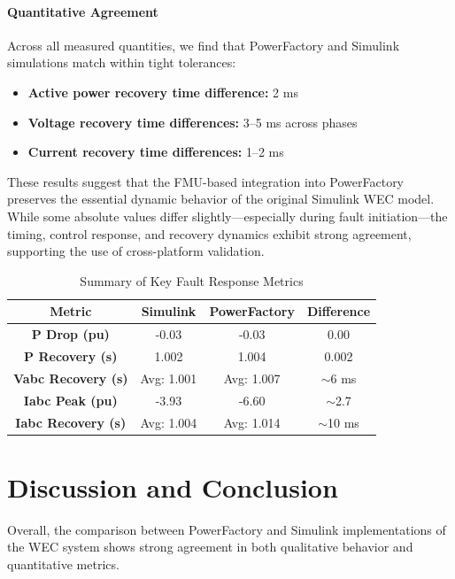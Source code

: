 \documentclass[conference]{IEEEtran}
\begin{document}
    \paragraph{Quantitative Agreement} Across all measured quantities, we find that PowerFactory and Simulink simulations match within tight tolerances:
    \begin{itemize}
        \item \textbf{Active power recovery time difference:} 2 ms
        \item \textbf{Voltage recovery time differences:} 3–5 ms across phases
        \item \textbf{Current recovery time differences:} 1–2 ms
    \end{itemize}
    
    These results suggest that the FMU-based integration into PowerFactory preserves the essential dynamic behavior of the original Simulink WEC model. While some absolute values differ slightly—especially during fault initiation—the timing, control response, and recovery dynamics exhibit strong agreement, supporting the use of cross-platform validation.


    \begin{table}[t]
        \centering
        \caption{Summary of Key Fault Response Metrics}
        \begin{tabular}{|c|c|c|c|}
        \hline
        \textbf{Metric} & \textbf{Simulink} & \textbf{PowerFactory} & \textbf{Difference} \\
        \hline
        \textbf{P Drop (pu)} & -0.03 & -0.03 & 0.00 \\
        \textbf{P Recovery (s)} & 1.002 & 1.004 & 0.002 \\
        \hline
        \textbf{Vabc Recovery (s)} & Avg: 1.001 & Avg: 1.007 & $\sim$6 ms \\
        \textbf{Iabc Peak (pu)} & -3.93 & -6.60 & $\sim$2.7 \\
        \textbf{Iabc Recovery (s)} & Avg: 1.004 & Avg: 1.014 & $\sim$10 ms \\
        \hline
        \end{tabular}
        \label{table:agreement_metrics}
    \end{table}

\section{Discussion and Conclusion}
    
    Overall, the comparison between PowerFactory and Simulink implementations of the WEC system shows strong agreement in both qualitative behavior and quantitative metrics.
    
\end{document}
